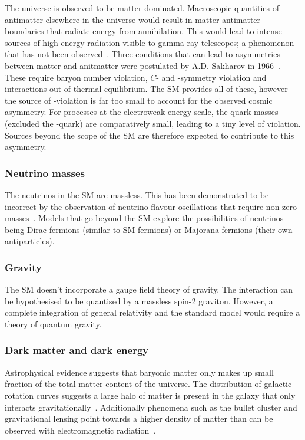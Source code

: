 The universe is observed to be matter dominated. Macroscopic quantities of antimatter elsewhere in the universe would result in matter-antimatter boundaries that radiate energy from annihilation. This would lead to intense sources of high energy radiation visible to gamma ray telescopes; a phenomenon that has not been observed~\cite{vonBallmoos2014}. 
Three conditions that can lead to asymmetries between matter and anitmatter were postulated by A.D. Sakharov in 1966~\cite{Sakharov:1967dj}. These require baryon number violation, $C$- and \CP-symmetry violation and interactions out of thermal equilibrium. The SM provides all of these, however the source of \CP-violation is far too small to account for the observed cosmic asymmetry. For processes at the electroweak energy scale, the quark masses (excluded the \tquark-quark) are comparatively small, leading to a tiny level of \CP violation. Sources beyond the scope of the SM are therefore expected to contribute to this asymmetry. 

\subsubsection{Neutrino masses} 
The neutrinos in the SM are massless. This has been demonstrated to be incorrect by the observation of neutrino flavour oscillations that require non-zero masses~\cite{PhysRevLett.81.1158,PhysRevLett.87.071301}. Models that go beyond the SM explore the possibilities of neutrinos being Dirac fermions (similar to SM fermions) or Majorana fermions (their own antiparticles). 

\subsubsection{Gravity}
The SM doesn't incorporate a gauge field theory of gravity. The interaction can be hypothesised to be quantised by a massless spin-2 graviton. However, a complete integration of general relativity and the standard model would require a theory of quantum gravity. 

\subsubsection{Dark matter and dark energy}
Astrophysical evidence suggests that baryonic matter only makes up small fraction of the total matter content of the universe. 
The distribution of galactic rotation curves suggests a large halo of matter is present in the galaxy that only interacts gravitationally~\cite{DMrotation}. Additionally phenomena such as the bullet cluster and gravitational lensing point towards a higher density of matter than can be observed with electromagnetic radiation~\cite{0004-637X-604-2-596,0004-637X-606-2-819}. 


